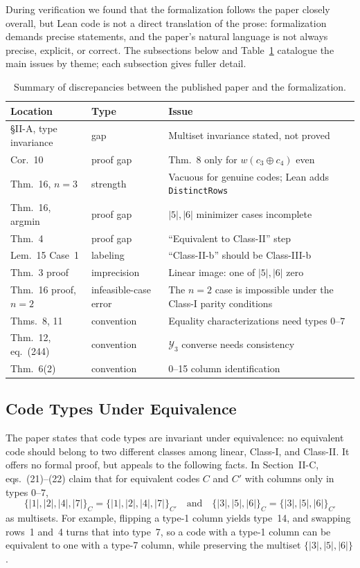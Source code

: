 \documentclass[12pt]{article}
\begin{document}
During verification we found that the formalization follows the paper
closely overall, but Lean code is not a direct translation of the prose:
formalization demands precise statements, and the paper's natural language is
not always precise, explicit, or correct.
The subsections below and Table~\ref{tab:discrepancies} catalogue the main
issues by theme; each subsection gives fuller detail.

\begin{table}[t]
  \centering
  \caption{Summary of discrepancies between the published paper and the
    formalization.}
  \label{tab:discrepancies}
  \small
  \begin{tabular}{@{}llp{}@{}}
  \toprule
  \textbf{Location} & \textbf{Type} & \textbf{Issue} \\
  \midrule
  \S II-A, type invariance & gap & Multiset invariance stated, not proved \\
  Cor.~10 & proof gap & Thm.~8 only for $w(c_3\oplus c_4)$ even \\
  Thm.~16, $n=3$ & strength & Vacuous for genuine codes; Lean adds \texttt{DistinctRows} \\
  Thm.~16, argmin & proof gap & $|5|,|6|$ minimizer cases incomplete \\
  Thm.~4 & proof gap & ``Equivalent to Class-II'' step \\
  Lem.~15 Case~1 & labeling & ``Class-II-b'' should be Class-III-b \\
  Thm.~3 proof & imprecision & Linear image: one of $|5|,|6|$ zero \\
  Thm.~16 proof, $n=2$ & infeasible-case error & The \(n=2\) case is impossible under the Class-I parity conditions\\
  Thms.~8, 11 & convention & Equality characterizations need types $0$--$7$ \\
  Thm.~12, eq.~(244) & convention & $\mathcal{Y}_3$ converse needs consistency \\
  Thm.~6(2) & convention & 0--15 column identification \\
  \bottomrule
\end{tabular}
\end{table}

\subsection[Code Type Invariance]{Code Types Under Equivalence}

The paper states that code types are invariant under equivalence: no
equivalent code should belong to two different classes among linear,
Class-I, and Class-II.
It offers no formal proof, but appeals to the following facts.
In Section~II-C, eqs.~(21)--(22) claim that for equivalent
codes $C$ and $C'$ with columns only in types $0$--$7$,
\[
  \{|1|,|2|,|4|,|7|\}_C = \{|1|,|2|,|4|,|7|\}_{C'}
  \quad\text{and}\quad
  \{|3|,|5|,|6|\}_C = \{|3|,|5|,|6|\}_{C'}
\]
as multisets. For example, flipping a type-1
column yields type~14, and swapping rows~1 and~4 turns that into type~7, so
a code with a type-1 column can be equivalent to one with a type-7 column, while preserving the multiset $\{|3|,|5|,|6|\}$.
\end{document}
